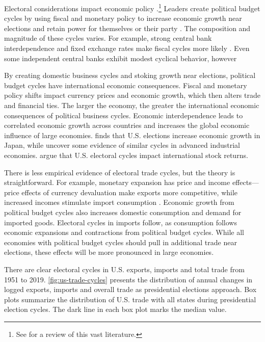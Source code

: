 \documentclass[12pt]{article}
\begin{document}
Electoral considerations impact economic policy \citep{Nordhaus1975}.\footnote{See \citet{Dubois2016} for a review of this vast literature.} 
Leaders create political budget cycles by using fiscal and monetary policy to increase economic growth near elections and retain power for themselves or their party \citep{Tufte1978, Rogoff1987}. 
The composition and magnitude of these cycles varies. 
For example, strong central bank interdependence and fixed exchange rates make fiscal cycles more likely \citep{ClarkHallerberg2000}. 
Even some independent central banks exhibit modest cyclical behavior, however \citep[pg. 247]{Dubois2016}


By creating domestic business cycles and stoking growth near elections, political budget cycles have international economic consequences.
Fiscal and monetary policy shifts impact currency prices and economic growth, which then alters trade and financial ties. 
The larger the economy, the greater the international economic consequences of political business cycles.
Economic interdependence leads to correlated economic growth across countries \citep{ArtisZhang1999, Kayser2006} and increases the global economic influence of large economies. 
\citet{Ito1991} finds that U.S. elections increase economic growth in Japan, while \citet{ThompsonZuk1983} uncover some evidence of similar cycles in advanced industrial economies.
\citet{FoersterSchmitz1997} argue that U.S. electoral cycles impact international stock returns.


There is less empirical evidence of electoral trade cycles, but the theory is straightforward.
For example, monetary expansion has price and income effects--- price effects of currency devaluation make exports more competitive, while increased incomes stimulate import consumption \citep{Sumner2021}.
Economic growth from political budget cycles also increases domestic consumption and demand for imported goods. 
Electoral cycles in imports follow, as consumption follows economic expansions and contractions from political budget cycles.  
While all economies with political budget cycles should pull in additional trade near elections, these effects will be more pronounced in large economies. 


There are clear electoral cycles in U.S. exports, imports and total trade from 1951 to 2019. 
\autoref{fig:us-trade-cycles} presents the distribution of annual changes in logged exports, imports and overall trade as presidential elections approach.
Box plots summarize the distribution of U.S. trade with all states during presidential election cycles. 
The dark line in each box plot marks the median value. 
\end{document}
